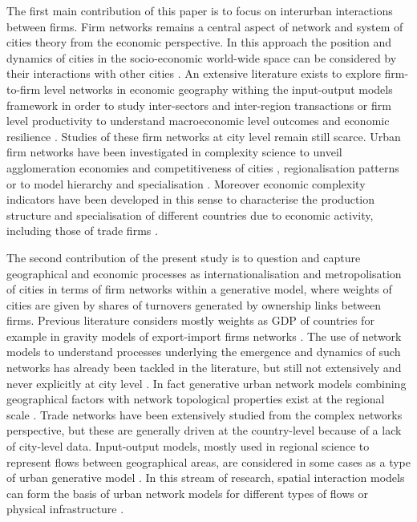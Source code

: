 \documentclass[10pt,letterpaper]{article}
\begin{document}
The first main contribution of this paper is to focus on interurban interactions between firms. Firm networks remains a central aspect of network and system of cities theory \cite{RozenblatNeal2021} from the economic perspective. In this approach the position and dynamics of cities in the socio-economic world-wide space can be considered by their interactions with other cities \cite{pumain2018evolutionary} \cite{berry1964cities}. An extensive literature exists to explore firm-to-firm level networks in economic geography withing the input-output models framework in order to study inter-sectors and inter-region transactions \cite{Rodriguesetal2016} or firm level productivity to understand macroeconomic level outcomes \cite{Grassi2016} and economic resilience \cite{Ialongo2021}. Studies of these firm networks at city level remain still scarce. Urban firm networks have been investigated in complexity science to unveil agglomeration economies and competitiveness of cities \cite{Rozenblat2010}, regionalisation patterns \cite{Rozenblatetal2017} or to model hierarchy and specialisation \cite{BidaRozenblat2020}. Moreover economic complexity indicators have been developed in this sense to characterise the production structure and specialisation of different countries due to economic activity, including those of trade firms \cite{HaussmanHidalgo2009,OCleary2016}. 

The second contribution of the present study is to question and capture geographical and economic processes as internationalisation and metropolisation of cities in terms of firm networks within a generative model, where weights of cities are given by shares of turnovers generated by ownership links between firms. Previous literature considers mostly weights as GDP of countries for example in gravity models of export-import firms networks \cite{Kepaptsogloual2010} \cite{MinondoRequena2013}. The use of network models to understand processes underlying the emergence and dynamics of such networks has already been tackled in the literature, but still not extensively and never explicitly at city level \cite{taylor2001specification}. In fact generative urban network models combining geographical factors with network topological properties exist at the regional scale {\cite{dai2016simulating}}. Trade networks have been extensively studied from the complex networks perspective, but these are generally driven at the country-level \cite{garlaschelli2005structure} because of a lack of city-level data. Input-output models, mostly used in regional science to represent flows between geographical areas, are considered in some cases as a type of urban generative model \cite{jin1993generation}. In this stream of research, spatial interaction models \cite{dennett2013multilevel} can form the basis of urban network models for different types of flows \cite{dai2016generative} or physical infrastructure \cite{raimbault2018indirect}. 
\end{document}
